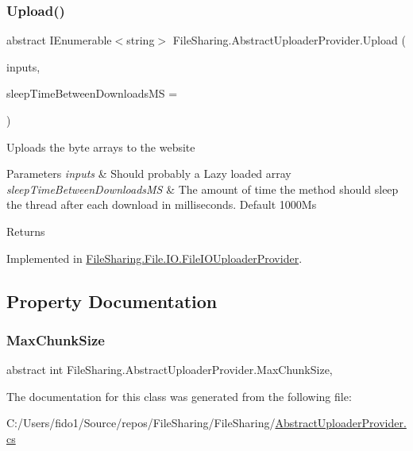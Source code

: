 \subsubsection{\texorpdfstring{Upload()}{Upload()}}
{\footnotesize\ttfamily abstract I\+Enumerable$<$string$>$ File\+Sharing.\+Abstract\+Uploader\+Provider.\+Upload (\begin{DoxyParamCaption}\item[{I\+Enumerable$<$ byte\mbox{[}$\,$\mbox{]}$>$}]{inputs,  }\item[{int}]{sleep\+Time\+Between\+Downloads\+MS = {} }\end{DoxyParamCaption})\hspace{0.3cm}{\ttfamily [pure virtual]}}



Uploads the byte arrays to the website 


\begin{DoxyParams}{Parameters}
{\em inputs} & Should probably a Lazy loaded array\\
\hline
{\em sleep\+Time\+Between\+Downloads\+MS} & The amount of time the method should sleep the thread after each download in milliseconds. Default 1000\+Ms\\
\hline
\end{DoxyParams}
\begin{DoxyReturn}{Returns}

\end{DoxyReturn}


Implemented in \hyperlink{class_file_sharing_1_1_file_1_1_i_o_1_1_file_i_o_uploader_provider_a991a7eebd1a55bc38e0b760a0f824928}{File\+Sharing.\+File.\+I\+O.\+File\+I\+O\+Uploader\+Provider}.



\subsection{Property Documentation}
\mbox{\label{class_file_sharing_1_1_abstract_uploader_provider_a5a62c7ab639093a3c4d7ea80c5b8a826}} 
\subsubsection{\texorpdfstring{Max\+Chunk\+Size}{MaxChunkSize}}
{\footnotesize\ttfamily abstract int File\+Sharing.\+Abstract\+Uploader\+Provider.\+Max\+Chunk\+Size\hspace{0.3cm}{\ttfamily [get]}, {}}



The documentation for this class was generated from the following file\+:\begin{DoxyCompactItemize}
\item 
C\+:/\+Users/fido1/\+Source/repos/\+File\+Sharing/\+File\+Sharing/\hyperlink{_abstract_uploader_provider_8cs}{Abstract\+Uploader\+Provider.\+cs}\end{DoxyCompactItemize}
